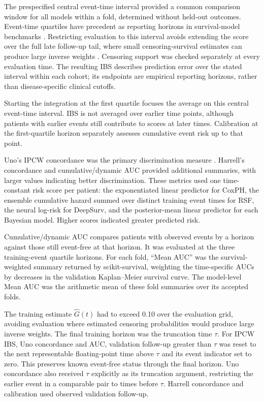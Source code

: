 The prespecified central event-time interval provided a common comparison window for all models within a fold, determined without held-out outcomes. Event-time quartiles have precedent as reporting horizons in survival-model benchmarks \cite{nagpal2021mixtures}. Restricting evaluation to this interval avoids extending the score over the full late follow-up tail, where small censoring-survival estimates can produce large inverse weights \cite{kvamme2023brier}. Censoring support was checked separately at every evaluation time. The resulting IBS describes prediction error over the stated interval within each cohort; its endpoints are empirical reporting horizons, rather than disease-specific clinical cutoffs.

Starting the integration at the first quartile focuses the average on this central event-time interval. IBS is not averaged over earlier time points, although patients with earlier events still contribute to scores at later times. Calibration at the first-quartile horizon separately assesses cumulative event risk up to that point.

Uno's IPCW concordance was the primary discrimination measure \cite{uno2011}. Harrell's concordance \cite{harrell1982} and cumulative/dynamic AUC provided additional summaries, with larger values indicating better discrimination. These metrics used one time-constant risk score per patient: the exponentiated linear predictor for CoxPH, the ensemble cumulative hazard summed over distinct training event times for RSF, the neural log-risk for DeepSurv, and the posterior-mean linear predictor for each Bayesian model. Higher scores indicated greater predicted risk.

Cumulative/dynamic AUC compares patients with observed events by a horizon against those still event-free at that horizon. It was evaluated at the three training-event quartile horizons. For each fold, ``Mean AUC'' was the survival-weighted summary returned by scikit-survival, weighting the time-specific AUCs by decreases in the validation Kaplan--Meier survival curve. The model-level Mean AUC was the arithmetic mean of these fold summaries over its accepted folds.

The training estimate $\widehat G(t)$ had to exceed 0.10 over the evaluation grid, avoiding evaluation where estimated censoring probabilities would produce large inverse weights. The final training horizon was the truncation time $\tau$. For IPCW IBS, Uno concordance and AUC, validation follow-up greater than $\tau$ was reset to the next representable floating-point time above $\tau$ and its event indicator set to zero. This preserves known event-free status through the final horizon. Uno concordance also received $\tau$ explicitly as its truncation argument, restricting the earlier event in a comparable pair to times before $\tau$. Harrell concordance and calibration used observed validation follow-up.


